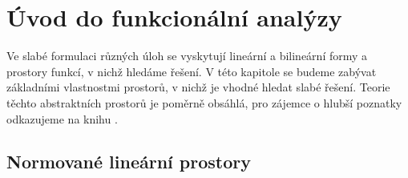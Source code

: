 \section{Úvod do funkcionální analýzy}

Ve slabé formulaci různých úloh se vyskytují lineární a bilineární formy a prostory funkcí, v nichž hledáme řešení.
V této kapitole se budeme zabývat základními vlastnostmi prostorů, v nichž je vhodné hledat slabé řešení.
Teorie těchto abstraktních prostorů je poměrně obsáhlá, pro zájemce o hlubší poznatky odkazujeme na knihu \cite{rektorys1974variacni}.


\subsection{Normované lineární prostory}


